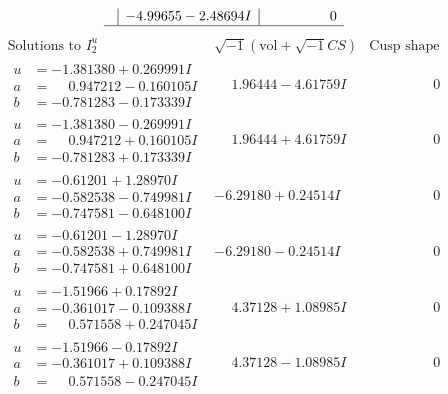 \documentclass[1p]{elsarticle_modified}
\theoremstyle{definition}
\newcommand{\I}{\sqrt{-1}}
\begin{document}
$$\begin{array}{c|c|c}
 & -4.99655 - 2.48694 I & \phantom{-0.000000 } 0\\
 \hline 
 \end{array}$$\newpage$$\begin{array}{c|c|c}  
\text{Solutions to }I^u_{2}& \I (\text{vol} + \sqrt{-1}CS) & \text{Cusp shape}\\
 \hline 
\begin{aligned}
u &= -1.381380 + 0.269991 I \\
a &= \phantom{-}0.947212 - 0.160105 I \\
b &= -0.781283 - 0.173339 I\end{aligned}
 & \phantom{-}1.96444 - 4.61759 I & \phantom{-0.000000 } 0 \\ \hline\begin{aligned}
u &= -1.381380 - 0.269991 I \\
a &= \phantom{-}0.947212 + 0.160105 I \\
b &= -0.781283 + 0.173339 I\end{aligned}
 & \phantom{-}1.96444 + 4.61759 I & \phantom{-0.000000 } 0 \\ \hline\begin{aligned}
u &= -0.61201 + 1.28970 I \\
a &= -0.582538 - 0.749981 I \\
b &= -0.747581 - 0.648100 I\end{aligned}
 & -6.29180 + 0.24514 I & \phantom{-0.000000 } 0 \\ \hline\begin{aligned}
u &= -0.61201 - 1.28970 I \\
a &= -0.582538 + 0.749981 I \\
b &= -0.747581 + 0.648100 I\end{aligned}
 & -6.29180 - 0.24514 I & \phantom{-0.000000 } 0 \\ \hline\begin{aligned}
u &= -1.51966 + 0.17892 I \\
a &= -0.361017 - 0.109388 I \\
b &= \phantom{-}0.571558 + 0.247045 I\end{aligned}
 & \phantom{-}4.37128 + 1.08985 I & \phantom{-0.000000 } 0 \\ \hline\begin{aligned}
u &= -1.51966 - 0.17892 I \\
a &= -0.361017 + 0.109388 I \\
b &= \phantom{-}0.571558 - 0.247045 I\end{aligned}
 & \phantom{-}4.37128 - 1.08985 I & \phantom{-0.000000 } 0 \\ \hline\begin{aligned}

\end{aligned}
\end{array}$$
\end{document}

